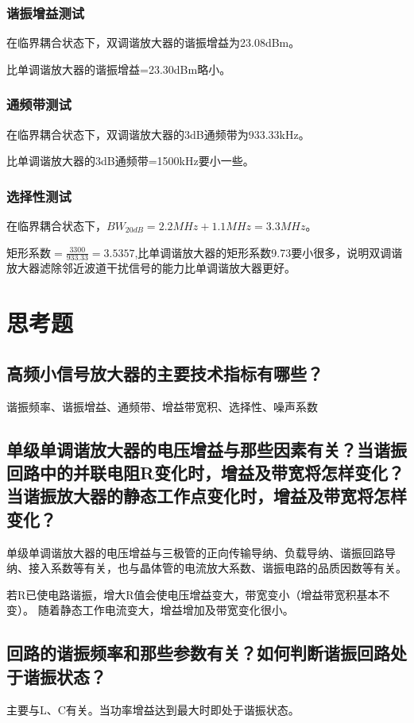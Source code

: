 \documentclass{../source/zjureport}
\begin{document}
	\subsubsection{谐振增益测试}
	在临界耦合状态下，双调谐放大器的谐振增益为23.08dBm。
	
	比单调谐放大器的谐振增益=23.30dBm略小。
	\subsubsection{通频带测试}
	在临界耦合状态下，双调谐放大器的3dB通频带为933.33kHz。
	
	比单调谐放大器的3dB通频带=1500kHz要小一些。
	\subsubsection{选择性测试}
	在临界耦合状态下，$BW_{20dB}=2.2MHz+1.1MHz=3.3MHz。$
	
	矩形系数$=\frac{3300}{933.33}=3.5357$,比单调谐放大器的矩形系数9.73要小很多，说明双调谐放大器滤除邻近波道干扰信号的能力比单调谐放大器更好。
	
	\section{思考题}
	\subsection{高频小信号放大器的主要技术指标有哪些？}
	
	谐振频率、谐振增益、通频带、增益带宽积、选择性、噪声系数
	
	\subsection{单级单调谐放大器的电压增益与那些因素有关？当谐振回路中的并联电阻R变化时，增益及带宽将怎样变化？当谐振放大器的静态工作点变化时，增益及带宽将怎样变化？}
	
	单级单调谐放大器的电压增益与三极管的正向传输导纳、负载导纳、谐振回路导纳、接入系数等有关，也与晶体管的电流放大系数、谐振电路的品质因数等有关。
	
	若R已使电路谐振，增大R值会使电压增益变大，带宽变小（增益带宽积基本不变）。
	随着静态工作电流变大，增益增加及带宽变化很小。

	\subsection{回路的谐振频率和那些参数有关？如何判断谐振回路处于谐振状态？}
	
	主要与L、C有关。当功率增益达到最大时即处于谐振状态。
	
\end{document}
